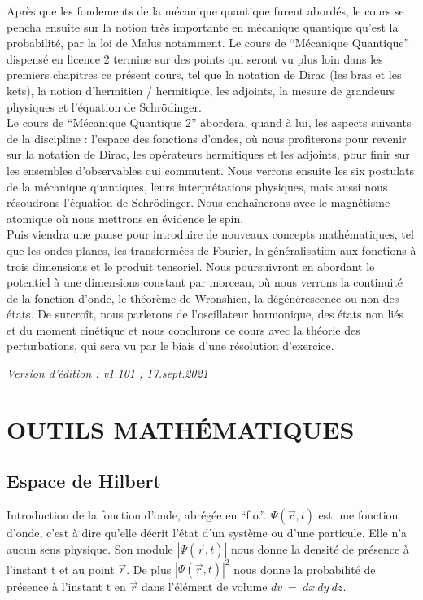 \documentclass[12pt,a4paper,titlepage]{book}
\begin{document}
Après que les fondements de la mécanique quantique furent abordés, le cours se pencha ensuite sur la notion très importante en mécanique quantique qu'est la probabilité, par la loi de Malus notamment. Le cours de \enquote{Mécanique Quantique} dispensé en licence 2 termine sur des points qui seront vu plus loin dans les premiers chapitres ce présent cours, tel que la notation de Dirac (les bras et les kets), la notion d'hermitien / hermitique, les adjoints, la mesure de grandeurs physiques et l'équation de Schrödinger.\\

Le cours de \enquote{Mécanique Quantique 2} abordera, quand à lui, les aspects suivants de la discipline : l'espace des fonctions d'ondes, où nous profiterons pour revenir sur la notation de Dirac, les opérateurs hermitiques et les adjoints, pour finir sur les ensembles d'observables qui commutent. Nous verrons ensuite les six postulats de la mécanique quantiques, leurs interprétations physiques, mais aussi nous résoudrons l'équation de Schrödinger. Nous enchaînerons avec le magnétisme atomique où nous mettrons en évidence le spin.\\

Puis viendra une pause pour introduire de nouveaux concepts mathématiques, tel que les ondes planes, les transformées de Fourier, la généralisation aux fonctions à trois dimensions et le produit tensoriel. Nous poursuivront en abordant le potentiel à une dimensions constant par morceau, où nous verrons la continuité de la fonction d'onde, le théorème de Wronshien, la dégénérescence ou non des états. De surcroît, nous parlerons de l'oscillateur harmonique, des états non liés et du moment cinétique et nous conclurons ce cours avec la théorie des perturbations, qui sera vu par le biais d'une résolution d'exercice.\\

\begin{center}
\textit{Version d'édition : v1.101 ; 17.sept.2021}
\end{center}

\newpage
\chapter{OUTILS MATHÉMATIQUES}
\section{Espace de Hilbert}
Introduction de la fonction d'onde, abrégée en \enquote{f.o.}. $\Psi (\overrightarrow{r}, t)$ est une fonction d'onde, c'est à dire qu'elle décrit l'état d'un système ou d'une particule. Elle n'a aucun sens physique. Son module $|\Psi (\overrightarrow{r}, t) |$ nous donne la densité de présence à l'instant t et au point $\overrightarrow{r}$. De plus $|\Psi (\overrightarrow{r}, t)|^2$ nous donne la probabilité de présence à l'instant t en $\overrightarrow{r}$ dans l'élément de volume $dv ~=~ dx~dy~dz$.\\
\end{document}
